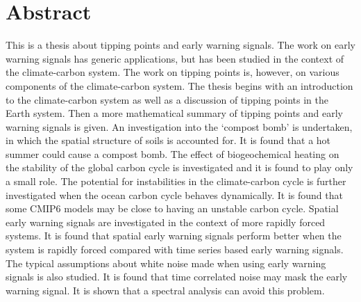 \chapter{Abstract}

This is a thesis about tipping points and early warning signals. The work on early warning signals has generic applications,
but has been studied in the context of the climate-carbon system. The work on tipping points is, however, on various components
of the climate-carbon system. The thesis begins with an introduction to the climate-carbon system as well as a discussion of tipping points in the
Earth system. Then a more mathematical summary of tipping points and early warning signals is given. An investigation into
the `compost bomb' is undertaken, in which the spatial structure of soils is accounted for. It is found that a hot summer could cause a compost bomb.
The effect of biogeochemical heating on the stability of the global carbon cycle is investigated and it is found to play only a small role.
The potential for instabilities in the climate-carbon cycle is further investigated when the ocean carbon cycle behaves dynamically. It is found
that some CMIP6 models may be close to having an unstable carbon cycle. Spatial early warning signals are investigated in the context of more rapidly forced
systems. It is found that spatial early warning signals perform better when the system is rapidly forced compared with time series based early warning signals.
The typical assumptions about white noise made when using early warning signals is also studied. It is found that time correlated noise may mask the
early warning signal. It is shown that a spectral analysis can avoid this problem.
